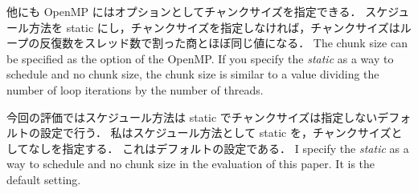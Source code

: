 他にも OpenMP にはオプションとしてチャンクサイズを指定できる．
スケジュール方法を static にし，チャンクサイズを指定しなければ，チャンクサイズはループの反復数をスレッド数で割った商とほぼ同じ値になる．
\fi
The chunk size can be specified as the option of the OpenMP.
If you specify the \textit{static} as a way to schedule and no chunk size,
the chunk size is similar to a value dividing the number of loop iterations by the number of threads.

今回の評価ではスケジュール方法は static でチャンクサイズは指定しないデフォルトの設定で行う．
私はスケジュール方法として static を，チャンクサイズとしてなしを指定する．
これはデフォルトの設定である．
\fi
I specify the \textit{static} as a way to schedule and no chunk size in the evaluation of this paper.
It is the default setting.
